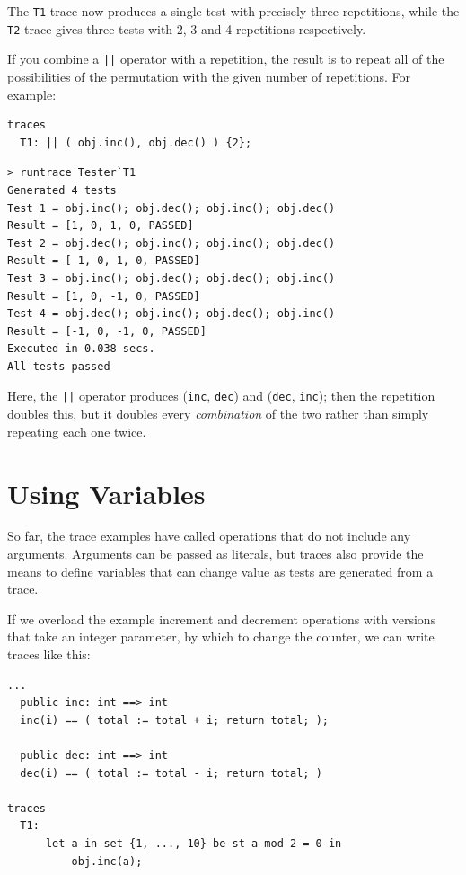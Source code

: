\documentclass{overturerepchap}
\begin{document}
\noindent The \texttt{T1} trace now produces a single test with precisely three
repetitions, while the \texttt{T2} trace gives three tests with 2, 3 and 4
repetitions respectively.

If you combine a \texttt{||} operator with a repetition, the result is to repeat
all of the possibilities of the permutation with the given number of repetitions.
For example:

\small
\begin{lstlisting}
traces
  T1: || ( obj.inc(), obj.dec() ) {2};
\end{lstlisting}

\lstset{style=tool,language=}
\begin{lstlisting}[escapechar=@]
> runtrace Tester`T1
Generated 4 tests
Test 1 = obj.inc(); obj.dec(); obj.inc(); obj.dec()
Result = [1, 0, 1, 0, PASSED]
Test 2 = obj.dec(); obj.inc(); obj.inc(); obj.dec()
Result = [-1, 0, 1, 0, PASSED]
Test 3 = obj.inc(); obj.dec(); obj.dec(); obj.inc()
Result = [1, 0, -1, 0, PASSED]
Test 4 = obj.dec(); obj.inc(); obj.dec(); obj.inc()
Result = [-1, 0, -1, 0, PASSED]
Executed in 0.038 secs. 
All tests passed
\end{lstlisting}
\lstset{style=mystyle}
\lstset{language=VDM++}
\normalsize

\noindent Here, the \texttt{||} operator produces (\texttt{inc}, \texttt{dec})
and (\texttt{dec}, \texttt{inc}); then the repetition doubles this, but it
doubles every \emph{combination} of the two rather than simply repeating each
one twice.

\section{Using Variables}

So far, the trace examples have called operations that do not include any
arguments. Arguments can be passed as literals, but traces also provide the
means to define variables that can change value as tests are generated from a
trace.

If we overload the example increment and decrement operations with versions that
take an integer parameter, by which to change the counter, we can write traces
like this:

\small
\begin{lstlisting}
...
  public inc: int ==> int
  inc(i) == ( total := total + i; return total; );

  public dec: int ==> int
  dec(i) == ( total := total - i; return total; )

traces
  T1:
      let a in set {1, ..., 10} be st a mod 2 = 0 in
          obj.inc(a);
\end{lstlisting}
\end{document}
